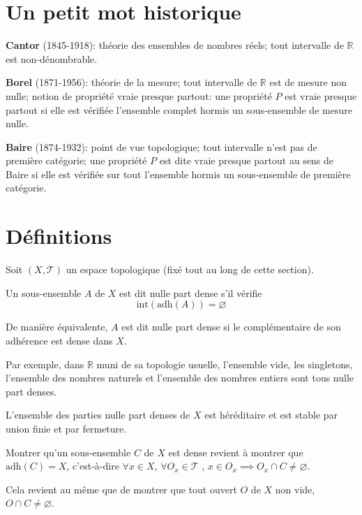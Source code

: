 \section{Un petit mot historique}
\textbf{Cantor} (1845-1918): théorie des ensembles de nombres réels;
tout intervalle de $\mathbb{R}$ est non-dénombrable.

\textbf{Borel} (1871-1956): théorie de la mesure; tout intervalle
de $\mathbb{R}$ est de mesure non nulle; notion de propriété vraie
presque partout: une propriété $P$ est vraie presque partout si
elle est vérifiée l'ensemble complet hormis un sous-ensemble de mesure
nulle.

\textbf{Baire} (1874-1932): point de vue topologique; tout intervalle
n'est pas de première catégorie; une propriété $P$ est dite
vraie presque partout au sens de Baire si elle est vérifiée sur tout
l'ensemble hormis un sous-ensemble de première catégorie.

\section{Définitions}

Soit $(X, \mathcal{T})$ un espace topologique (fixé tout au long de cette
section).

\begin{df}
  Un sous-ensemble $A$ de $X$ est dit nulle part dense s'il vérifie
  $$\mathrm{int}\left(\mathrm{adh}(A)\right) = \varnothing$$

  De manière équivalente, $A$ est dit nulle part dense si le complémentaire
  de son adhérence est dense dans $X$.
\end{df}

Par exemple, dans $\mathbb{R}$ muni de sa topologie usuelle, l'ensemble
vide, les singletons, l'ensemble des nombres naturels et l'ensemble des
nombres entiers sont tous nulle part denses.

\begin{prop}
  L'ensemble des parties nulle part denses de $X$ est héréditaire et
  est stable par union finie  et par fermeture.
\end{prop}

\begin{rem}
  Montrer qu'un sous-ensemble $C$ de $X$ est dense revient à
  montrer que $\mathrm{adh}(C) = X$, c'est-à-dire
  $\forall x\in X$, $\forall O_x\in\mathcal{T}$ , $x\in O_x\implies O_x\cap C\neq
  \varnothing$.

  Cela revient au même que de montrer que tout ouvert $O$ de $X$ non vide,
  $O\cap C\neq \varnothing$.
\end{rem}

